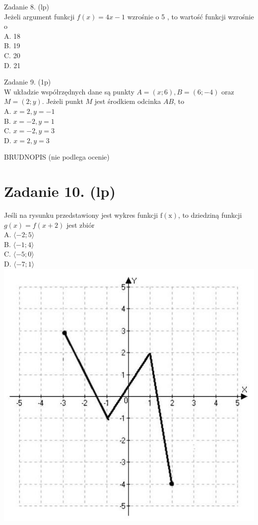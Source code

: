 \documentclass[10pt]{article}
\begin{document}
Zadanie 8. (lp)\\
Jeżeli argument funkcji \(f(x)=4 x-1\) wzrośnie o 5 , to wartość funkcji wzrośnie o\\
A. 18\\
B. 19\\
C. 20\\
D. 21

Zadanie 9. (1p)\\
W układzie współrzędnych dane są punkty \(A=(x ; 6), B=(6 ;-4)\) oraz \(M=(2 ; y)\). Jeżeli punkt \(M\) jest środkiem odcinka \(A B\), to\\
A. \(x=2, y=-1\)\\
B. \(x=-2, y=1\)\\
C. \(x=-2, y=3\)\\
D. \(x=2, y=3\)

BRUDNOPIS (nie podlega ocenie)

\section*{Zadanie 10. (lp)}
Jeśli na rysunku przedstawiony jest wykres funkcji \(\mathrm{f}(\mathrm{x})\), to dziedziną funkcji \(g(x)=f(x+2)\) jest zbiór\\
A. \(\langle-2 ; 5\rangle\)\\
B. \(\langle-1 ; 4\rangle\)\\
C. \(\langle-5 ; 0\rangle\)\\
D. \(\langle-7 ; 1\rangle\)\\
\includegraphics[max width=\textwidth, center]{2024_11_21_90ea54b753259b37713ag-04(1)}
\end{document}
